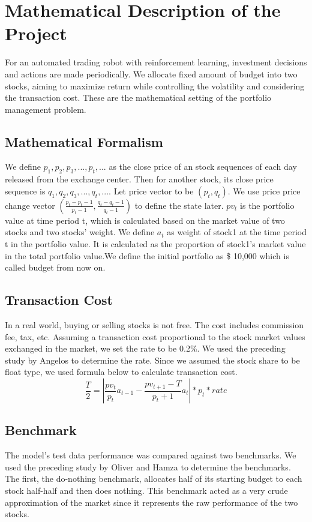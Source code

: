 \chapter{Mathematical Description of the Project}
\label{Ch:mathematical description}
For an automated trading robot with reinforcement learning, investment decisions and actions are made periodically. We allocate fixed amount of budget into two stocks, aiming to maximize return while controlling the volatility and considering the transaction cost. These are the mathematical setting of the portfolio management problem.

\section{Mathematical Formalism}
We define $p_1,p_2,p_3,...,p_t,...$ as the close price of an stock sequences of each day released from the exchange center. Then for another stock, its close price sequence is $q_1,q_2,q_3,...,q_t,...$. Let price vector to be $(p_t, q_t)$. We use price price change vector $(\frac{p_t-p_t-1}{p_t-1},\frac{q_t-q_t-1}{q_t-1})$ to define the state later.
$pv_t$ is the portfolio value at time period t, which is calculated based on the market value of two stocks and two stocks' weight. We define $a_t$ as weight of stock1 at the time period t in the portfolio value. It is calculated as the proportion of stock1's market value in the total portfolio value.We define the initial portfolio as \$ 10,000 which is called budget from now on.



\section{Transaction Cost}
In a real world, buying or selling stocks is not free. The cost includes commission fee, tax, etc. Assuming a transaction cost proportional to the stock market values exchanged in the market, we set the rate to be 0.2\%. We used the preceding study by Angelos to determine the rate. Since we assumed the stock share to be float type, we used formula below to calculate transaction cost. 
$$\frac{T}{2} = |\frac{pv_t}{p_t}a_{t-1} - \frac{pv_{t+1}-T}{p_t+1}a_t|*p_t*rate$$


\section{Benchmark}
The model’s test data performance was compared against two benchmarks. We used the preceding study by Oliver and Hamza to determine the benchmarks. The first, the do-nothing benchmark, allocates half of its starting budget to each stock half-half and then does nothing. This benchmark acted as a very crude approximation of the market since it represents the raw performance of the two stocks.

